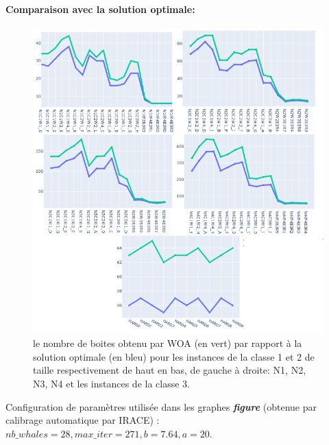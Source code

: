 \documentclass[12pt]{article}
\begin{document}
\paragraph{Comparaison avec la solution optimale: }
\begin{figure}[h!]
    \includegraphics[width=14cm]{../figures/WOA/woa_opt.png}
    \caption{le nombre de boites obtenu par WOA (en vert) par rapport à la solution optimale (en bleu) pour les instances de la classe 1 et 2 de taille respectivement de haut en bas, de gauche à droite: N1, N2, N3, N4 et les instances de la classe 3.}
    \label{fig:compare}
\end{figure}
Configuration de paramètres utilisée dans les graphes \textbf{\emph{figure }} (obtenue par calibrage automatique par IRACE) : \(nb\_whales=28, max\_iter=271,  b=7.64, a=20\).
\end{document}
